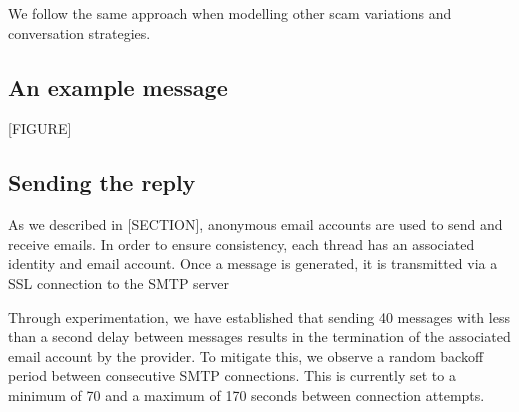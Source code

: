 We follow the same approach when modelling other scam variations and conversation strategies.

\subsection{An example message}

[FIGURE]

\subsection{Sending the reply}

As we described in [SECTION], anonymous email accounts are used to send and receive emails. In order to ensure consistency, each thread has an associated identity and email account. Once a message is generated, it is transmitted via a SSL connection to the SMTP server

Through experimentation, we have established that sending 40 messages with less than a second delay between messages results in the termination of the associated email account by the provider. To mitigate this, we observe a random backoff period between consecutive SMTP connections. This is currently set to a minimum of 70 and a maximum of 170 seconds between connection attempts.